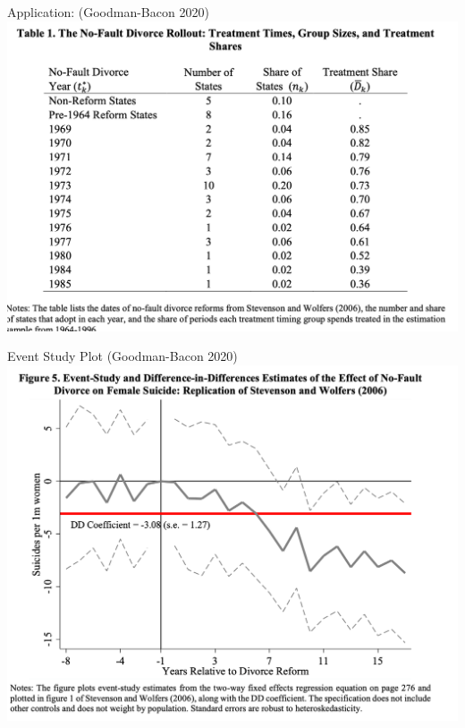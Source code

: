 \documentclass[xcolor=pdftex,dvipsnames,table,mathserif,aspectratio=169]{beamer}
\begin{document}
\begin{frame}{Application: (Goodman-Bacon 2020)}
\centering
\includegraphics[height=0.9\textheight]{resources/gb_tab1.png}
\end{frame}


\begin{frame}{Event Study Plot (Goodman-Bacon 2020)}
\centering
\includegraphics[height=0.9\textheight]{resources/gb_fig5.png}
\end{frame}
\end{document}
